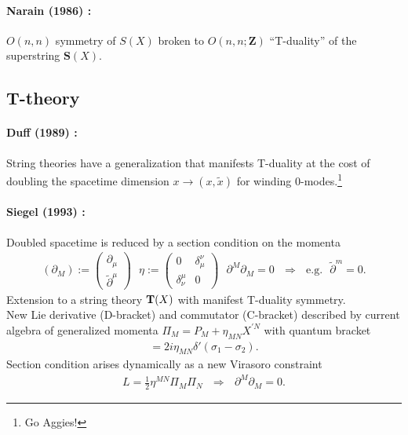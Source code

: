 \documentclass[12pt]{article} %
\numberwithin{equation}{section}
\begin{document}
\paragraph{
	Narain (1986) \cite{Narain:1985jj}:
} 
$O(n,n)$ symmetry of $S(X)$ broken to $O(n,n;\mathbf Z)$ ``T-duality'' of the superstring $\mathbf S(X)$.

\subsection{T-theory}
\paragraph{
	Duff (1989) \cite{Duff:1989tf}:
}
String theories have a generalization that manifests T-duality at the cost of doubling the spacetime dimension $x \to (x, \tilde x)$ for winding 0-modes.\footnote{Go Aggies!} 
\paragraph{
	Siegel (1993) \cite{Siegel:1993bj,Siegel:1993th,Siegel:1993xq}: 
}
Doubled spacetime is reduced by a section condition on the momenta
\begin{align*}
(\partial_M) := \left(\begin{array}{c} \partial_\mu \\ \tilde \partial^\mu \end{array}\right)
~~~
\eta := \left(\begin{array}{cc} 0 & \delta_\mu^\nu \\ \delta^\mu_\nu & 0\end{array}\right)
~~~
\partial^M \partial_M = 0 
~~~\Rightarrow~~~\mathrm{e.g.} ~~~
\tilde \partial^m = 0.
\end{align*}
Extension to a string theory ${\bf T}(X)$ with manifest T-duality symmetry.\\
New Lie derivative (D-bracket) and commutator (C-bracket) described by current algebra of generalized momenta $\Pi_M = P_M + \eta_{MN}X^{\prime N}$ with quantum bracket 
\begin{align*}
[\Pi_M(\sigma_1) , \Pi_N(\sigma_2) ] = 2i \eta_{MN} \delta'(\sigma_1-\sigma_2).
\end{align*}
Section condition arises dynamically as a new Virasoro constraint
\begin{align*}
L = \tfrac12 \eta^{MN} \Pi_M \Pi_N
~~~\Rightarrow~~~
\partial^M \partial_M = 0 .
\end{align*}
\end{document}

